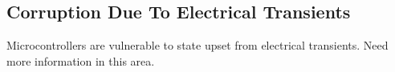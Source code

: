 \chapter{\chrqzerolongtitle{}}

\label{chrq0}


\section{Corruption Due To Electrical Transients}

Microcontrollers are vulnerable to state upset
from electrical transients.  Need more
information in this area.


